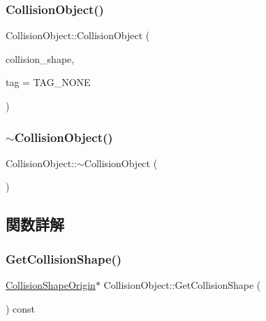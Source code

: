 \subsubsection{\texorpdfstring{Collision\+Object()}{CollisionObject()}}
{\footnotesize\ttfamily Collision\+Object\+::\+Collision\+Object (\begin{DoxyParamCaption}\item[{\mbox{\hyperlink{class_collision_shape_origin}{Collision\+Shape\+Origin}} $\ast$}]{collision\+\_\+shape,  }\item[{int}]{tag = {\ttfamily TAG\+\_\+NONE} }\end{DoxyParamCaption})}

\mbox{\label{class_collision_object_a8c4e6916bc5911b8a82498536d5a27e1}} 
\subsubsection{\texorpdfstring{$\sim$\+Collision\+Object()}{~CollisionObject()}}
{\footnotesize\ttfamily Collision\+Object\+::$\sim$\+Collision\+Object (\begin{DoxyParamCaption}{ }\end{DoxyParamCaption})}



\subsection{関数詳解}
\mbox{\label{class_collision_object_a91922573ea16575f5a8896f77efe9957}} 
\subsubsection{\texorpdfstring{Get\+Collision\+Shape()}{GetCollisionShape()}}
{\footnotesize\ttfamily \mbox{\hyperlink{class_collision_shape_origin}{Collision\+Shape\+Origin}}$\ast$ Collision\+Object\+::\+Get\+Collision\+Shape (\begin{DoxyParamCaption}{ }\end{DoxyParamCaption}) const\hspace{0.3cm}{\ttfamily [inline]}}

